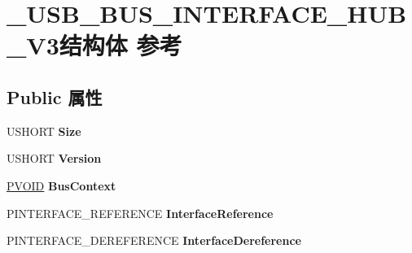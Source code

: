 \hypertarget{struct___u_s_b___b_u_s___i_n_t_e_r_f_a_c_e___h_u_b___v3}{}\section{\+\_\+\+U\+S\+B\+\_\+\+B\+U\+S\+\_\+\+I\+N\+T\+E\+R\+F\+A\+C\+E\+\_\+\+H\+U\+B\+\_\+\+V3结构体 参考}
\label{struct___u_s_b___b_u_s___i_n_t_e_r_f_a_c_e___h_u_b___v3}
\subsection*{Public 属性}
\begin{DoxyCompactItemize}
\item 
\mbox{\label{struct___u_s_b___b_u_s___i_n_t_e_r_f_a_c_e___h_u_b___v3_a250e633617f6bdaa09b0f0b92691dc13}} 
U\+S\+H\+O\+RT {\bfseries Size}
\item 
\mbox{\label{struct___u_s_b___b_u_s___i_n_t_e_r_f_a_c_e___h_u_b___v3_ac30c433b7abee2d12c7ae2dcd8114e61}} 
U\+S\+H\+O\+RT {\bfseries Version}
\item 
\mbox{\label{struct___u_s_b___b_u_s___i_n_t_e_r_f_a_c_e___h_u_b___v3_a198da7352a002d717f44ba2e2aa80af4}} 
\hyperlink{interfacevoid}{P\+V\+O\+ID} {\bfseries Bus\+Context}
\item 
\mbox{\label{struct___u_s_b___b_u_s___i_n_t_e_r_f_a_c_e___h_u_b___v3_a1c8994b0a673291096d76cdc3562fb21}} 
P\+I\+N\+T\+E\+R\+F\+A\+C\+E\+\_\+\+R\+E\+F\+E\+R\+E\+N\+CE {\bfseries Interface\+Reference}
\item 
\mbox{\label{struct___u_s_b___b_u_s___i_n_t_e_r_f_a_c_e___h_u_b___v3_a369b394b36e66856c5235f1893177c27}} 
P\+I\+N\+T\+E\+R\+F\+A\+C\+E\+\_\+\+D\+E\+R\+E\+F\+E\+R\+E\+N\+CE {\bfseries Interface\+Dereference}
\item 
\mbox{\label{struct___u_s_b___b_u_s___i_n_t_e_r_f_a_c_e___h_u_b___v3_a3c5c93fc108b09bdfa9f91f59d544c38}} 

\end{DoxyCompactItemize}
